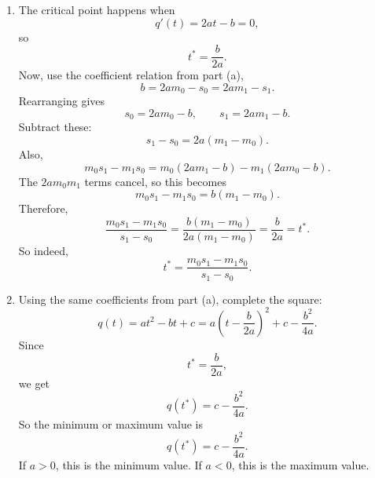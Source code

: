 \documentclass[10pt]{extarticle}
\begin{document}
\begin{enumerate}[label=(\alph*)]
\item The critical point happens when
\[
q'(t)=2at-b=0,
\]
so
\[
t^*=\frac{b}{2a}.
\]
Now, use the coefficient relation from part (a),
\[
b=2am_0-s_0=2am_1-s_1.
\]
Rearranging gives
\[
s_0=2am_0-b,
\qquad
s_1=2am_1-b.
\]
Subtract these:
\[
s_1-s_0=2a(m_1-m_0).
\]
Also,
\[
m_0s_1-m_1s_0
=m_0(2am_1-b)-m_1(2am_0-b).
\]
The $2am_0m_1$ terms cancel, so this becomes
\[
m_0s_1-m_1s_0=b(m_1-m_0).
\]
Therefore,
\[
\frac{m_0s_1-m_1s_0}{s_1-s_0}
=\frac{b(m_1-m_0)}{2a(m_1-m_0)}
=\frac{b}{2a}
=t^*.
\]
So indeed,
\[
t^*=\frac{m_0s_1-m_1s_0}{s_1-s_0}.
\]

\item Using the same coefficients from part (a), complete the square:
\[
q(t)=at^2-bt+c
=a\left(t-\frac{b}{2a}\right)^2+c-\frac{b^2}{4a}.
\]
Since
\[
t^*=\frac{b}{2a},
\]
we get
\[
q(t^*)=c-\frac{b^2}{4a}.
\]
So the minimum or maximum value is
\[
\boxed{q(t^*)=c-\frac{b^2}{4a}}.
\]
If $a>0$, this is the minimum value. If $a<0$, this is the maximum value.
\end{enumerate}

\newpage
\end{document}
